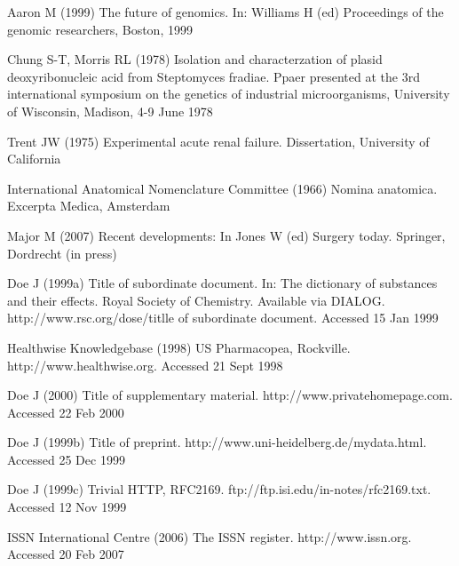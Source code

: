 \documentclass{EPS}
\begin{document}
\begin{thebibliography}{}
Aaron M (1999)
The future of genomics.
In: Williams H (ed) Proceedings of the genomic researchers, Boston, 1999

Chung S-T, Morris RL (1978)
Isolation and characterzation of plasid deoxyribonucleic acid
from Steptomyces fradiae.
Ppaer presented at the 3rd international symposium
on the genetics of industrial microorganisms,
University of Wisconsin, Madison, 4-9 June 1978


Trent JW (1975)
Experimental acute renal failure.
Dissertation, University of California

International Anatomical Nomenclature Committee (1966)
Nomina anatomica. Excerpta Medica, Amsterdam

Major M (2007)
Recent developments: In Jones W (ed) Surgery today.
Springer, Dordrecht (in press)

Doe J (1999a)
Title of subordinate document.
In: The dictionary of substances and their effects.
Royal Society of Chemistry. Available via DIALOG.
http://www.rsc.org/dose/titlle of subordinate document.
Accessed 15 Jan 1999

Healthwise Knowledgebase (1998)
US Pharmacopea, Rockville.
http://www.healthwise.org. Accessed 21 Sept 1998

Doe J (2000)
Title of supplementary material.
http://www.privatehomepage.com. Accessed 22 Feb 2000

Doe J (1999b)
Title of preprint.
http://www.uni-heidelberg.de/mydata.html. Accessed 25 Dec 1999

Doe J (1999c)
Trivial HTTP, RFC2169.
ftp://ftp.isi.edu/in-notes/rfc2169.txt. Accessed 12 Nov 1999

ISSN International Centre (2006)
The ISSN register. http://www.issn.org. Accessed 20 Feb 2007

\end{thebibliography}{}
\end{document}
